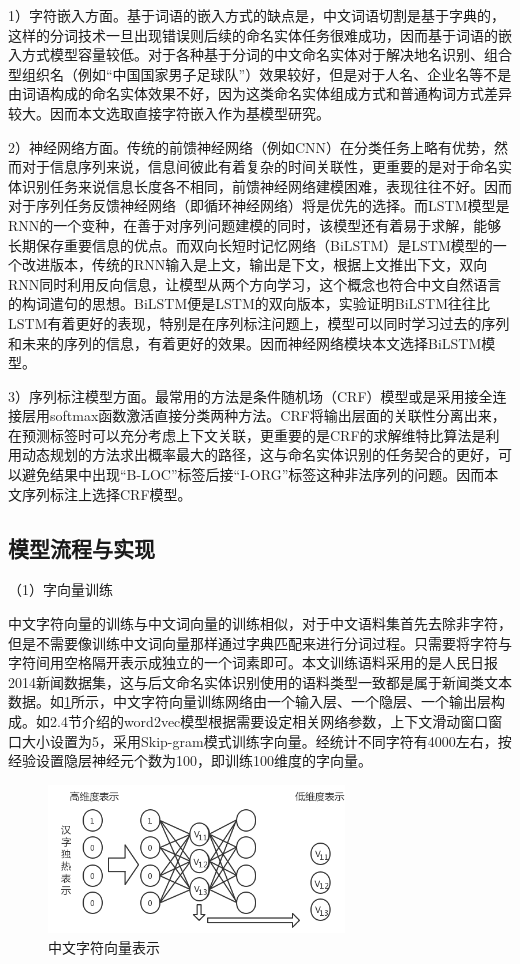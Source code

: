 \documentclass[winfonts,master,oneside,nobackinfo]{njuthesis}
\begin{document}
1）字符嵌入方面。基于词语的嵌入方式的缺点是，中文词语切割是基于字典的，这样的分词技术一旦出现错误则后续的命名实体任务很难成功，因而基于词语的嵌入方式模型容量较低。对于各种基于分词的中文命名实体对于解决地名识别、组合型组织名（例如“中国国家男子足球队”）效果较好，但是对于人名、企业名等不是由词语构成的命名实体效果不好，因为这类命名实体组成方式和普通构词方式差异较大。因而本文选取直接字符嵌入作为基模型研究。

2）神经网络方面。传统的前馈神经网络（例如CNN）在分类任务上略有优势，然而对于信息序列来说，信息间彼此有着复杂的时间关联性，更重要的是对于命名实体识别任务来说信息长度各不相同，前馈神经网络建模困难，表现往往不好。因而对于序列任务反馈神经网络（即循环神经网络）将是优先的选择。而LSTM模型是RNN的一个变种，在善于对序列问题建模的同时，该模型还有着易于求解，能够长期保存重要信息的优点。而双向长短时记忆网络（BiLSTM）是LSTM模型的一个改进版本，传统的RNN输入是上文，输出是下文，根据上文推出下文，双向RNN同时利用反向信息，让模型从两个方向学习，这个概念也符合中文自然语言的构词遣句的思想。BiLSTM便是LSTM的双向版本，实验证明BiLSTM往往比LSTM有着更好的表现\cite{Graves}，特别是在序列标注问题上，模型可以同时学习过去的序列和未来的序列的信息，有着更好的效果\cite{Huang}。因而神经网络模块本文选择BiLSTM模型。

3）序列标注模型方面。最常用的方法是条件随机场（CRF）模型或是采用接全连接层用softmax函数激活直接分类两种方法。CRF将输出层面的关联性分离出来，在预测标签时可以充分考虑上下文关联，更重要的是CRF的求解维特比算法是利用动态规划的方法求出概率最大的路径，这与命名实体识别的任务契合的更好，可以避免结果中出现“B-LOC”标签后接“I-ORG”标签这种非法序列的问题。因而本文序列标注上选择CRF模型。

\subsection{模型流程与实现}

（1）字向量训练

中文字符向量的训练与中文词向量的训练相似，对于中文语料集首先去除非字符，但是不需要像训练中文词向量那样通过字典匹配来进行分词过程。只需要将字符与字符间用空格隔开表示成独立的一个词素即可。本文训练语料采用的是人民日报2014新闻数据集，这与后文命名实体识别使用的语料类型一致都是属于新闻类文本数据。如\ref{char2vec}所示，中文字符向量训练网络由一个输入层、一个隐层、一个输出层构成。如2.4节介绍的word2vec模型根据需要设定相关网络参数，上下文滑动窗口窗口大小设置为5，采用Skip-gram模式训练字向量。经统计不同字符有4000左右，按经验设置隐层神经元个数为100，即训练100维度的字向量。

\begin{figure}[h]
\centering
\includegraphics[width=0.7\textwidth]{./figure/char2vec.jpg}
\caption{中文字符向量表示}
\label{char2vec}
\end{figure}
\end{document}
